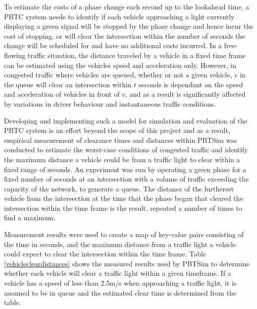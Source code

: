 To estimate the costs of a phase change each second up to the lookahead time, a PBTC system needs to identify if each vehicle approaching a light currently displaying a green signal will be stopped by the phase change and hence incur the cost of stopping, or will clear the intersection within the number of seconds the change will be scheduled for and have no additional costs incurred. In a free-flowing traffic situation, the distance traveled by a vehicle in a fixed time frame can be estimated using the vehicles speed and acceleration only. However, in congested traffic where vehicles are queued, whether or not a given vehicle, $v$ in the queue will clear an intersection within $t$ seconds is dependant on the speed and acceleration of vehicles in front of $v$, and as a result is significantly affected by variations in driver behaviour and instantaneous traffic conditions. 

Developing and implementing such a model for simulation and evaluation of the PBTC system is an effort beyond the scope of this project and as a result, empirical measurement of clearance times and distances within PBTSim was conducted to estimate the worst-case conditions of congested traffic and identify the maximum distance a vehicle could be from a traffic light to clear within a fixed range of seconds. An experiment was run by operating a green phase for a fixed number of seconds at an intersection with a volume of traffic exceeding the capacity of the network, to generate a queue. The distance of the furtherest vehicle from the intersection at the time that the phase began that cleared the intersection within the time frame is the result, repeated a number of times to find a maximum. 

Measurement results were used to create a map of key-value pairs consisting of the time in seconds, and the maximum distance from a traffic light a vehicle could expect to clear the intersection within the time frame. Table \ref{vehiclecleardistances} shows the measured results used by PBTSim to determine whether each vehicle will clear a traffic light within a given timeframe. If a vehicle has a speed of less than 2.5m/s when approaching a traffic light, it is assumed to be in queue and the estimated clear time is determined from the table.

